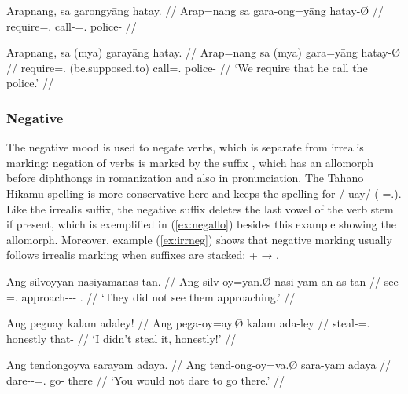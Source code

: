 \pex
\a\ljudge*\begingl
	\gla Arapnang, sa garongyāng hatay. //
	\glb Arap=nang sa gara-ong=yāng hatay-Ø //
	\glc require=\Fpl{}.\Aarg{} \PatT{} call-\Irr{}=\TsgM{}.\Aarg{} 
		police-\Top{} //
\endgl

\a\label{ex:myashall}\begingl
	\gla Arapnang, sa {\normalfont (}mya{\normalfont )} garayāng hatay. //
	\glb Arap=nang sa (mya) gara=yāng hatay-Ø //
	\glc require=\Fpl{}.\Aarg{} \PatT{} (be.supposed.to) 
		call=\TsgM{}.\Aarg{} police-\Top{} //
	\glft `We require that he call the police.' //
\endgl
\xe


\subsubsection{Negative}
\label{subsubsec:verbneg}

The negative mood is used to negate verbs, which is separate from irrealis
marking: negation of verbs is marked by the suffix , which has
an allomorph  before diphthongs in romanization and also in
pronunciation. The Tahano Hikamu spelling is more conservative here and keeps
the spelling   for /-uay/
(\mbox{-\Neg{}=\Fsg{}.\Top{}}). Like the irrealis suffix, the
negative suffix deletes the last vowel of the verb stem if present, which is
exemplified in (\ref{ex:negallo}) besides this example showing the 
allomorph. Moreover, example (\ref{ex:irrneg}) shows that negative marking
usually follows irrealis marking when suffixes are stacked:  +
 → .

\pex
\a\label{ex:negative}\begingl
	\gla Ang silvoyyan nasiyamanas tan. //
	\glb Ang silv-oy=yan.Ø nasi-yam-an-as tan //
	\glc \AgtT{} see-\Neg{}=\TplM{}.\Top{} approach-\Ptcp{}-\Nmlz{}-\Parg{} 
		\TplM{}.\Gen{} //
	\glft `They did not see them approaching.' //
\endgl

\a\label{ex:negallo}\begingl
	\gla Ang peguay kalam adaley!  //
	\glb Ang pega-oy=ay.Ø kalam ada-ley //
	\glc \AgtT{} steal-\Neg{}=\Fsg{}.\Top{} honestly that-\PargI{} //
	\glft `I didn't steal it, honestly!' //
\endgl

\a\label{ex:irrneg}\begingl
	\gla Ang tendongoyva sarayam adaya. //
	\glb Ang tend-ong-oy=va.Ø sara-yam adaya //
	\glc \AgtT{} dare-\Irr{}-\Neg{}=\Ssg{}.\Top{} go-\Ptcp{} there //
	\glft `You would not dare to go there.' //
\endgl

